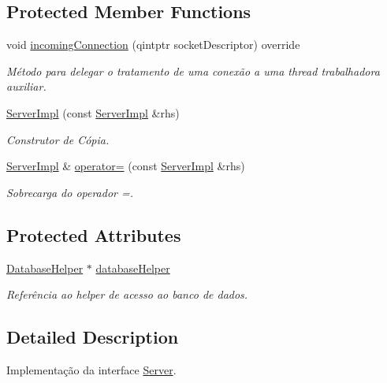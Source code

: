 \subsection*{Protected Member Functions}
\begin{DoxyCompactItemize}
\item 
void \hyperlink{classServerImpl_a54dda38486e9964432b501f7da00ed97}{incoming\+Connection} (qintptr socket\+Descriptor) override
\begin{DoxyCompactList}\small\item\em Método para delegar o tratamento de uma conexão a uma thread trabalhadora auxiliar. \end{DoxyCompactList}\item 
\hyperlink{classServerImpl_ad288c40b899759a72121cbcd60817cf9}{Server\+Impl} (const \hyperlink{classServerImpl}{Server\+Impl} \&rhs)
\begin{DoxyCompactList}\small\item\em Construtor de Cópia. \end{DoxyCompactList}\item 
\hyperlink{classServerImpl}{Server\+Impl} \& \hyperlink{classServerImpl_aa3cc217c7588777ec4deb99132f847ef}{operator=} (const \hyperlink{classServerImpl}{Server\+Impl} \&rhs)
\begin{DoxyCompactList}\small\item\em Sobrecarga do operador =. \end{DoxyCompactList}\end{DoxyCompactItemize}
\subsection*{Protected Attributes}
\begin{DoxyCompactItemize}
\item 
\hyperlink{classDatabaseHelper}{Database\+Helper} $\ast$ \hyperlink{classServerImpl_af78b294c790b327b0023f295c5d7508c}{database\+Helper}\hypertarget{classServerImpl_af78b294c790b327b0023f295c5d7508c}{}\label{classServerImpl_af78b294c790b327b0023f295c5d7508c}

\begin{DoxyCompactList}\small\item\em Referência ao helper de acesso ao banco de dados. \end{DoxyCompactList}\end{DoxyCompactItemize}


\subsection{Detailed Description}
Implementação da interface \hyperlink{classServer}{Server}. 

